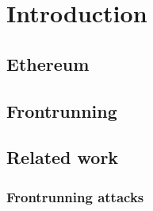 \documentclass[draft,final]{vutinfth} %
\begin{document}
\frontmatter %

\addstatementpage

\begin{danksagung*}
\end{danksagung*}

\begin{acknowledgements*}
\end{acknowledgements*}

\begin{kurzfassung}
\end{kurzfassung}

\begin{abstract}
\end{abstract}


\tableofcontents %

\mainmatter

\chapter{Introduction}

\section{Ethereum}

\section{Frontrunning}

\section{Related work}

\subsection{Frontrunning attacks}
\end{document}
